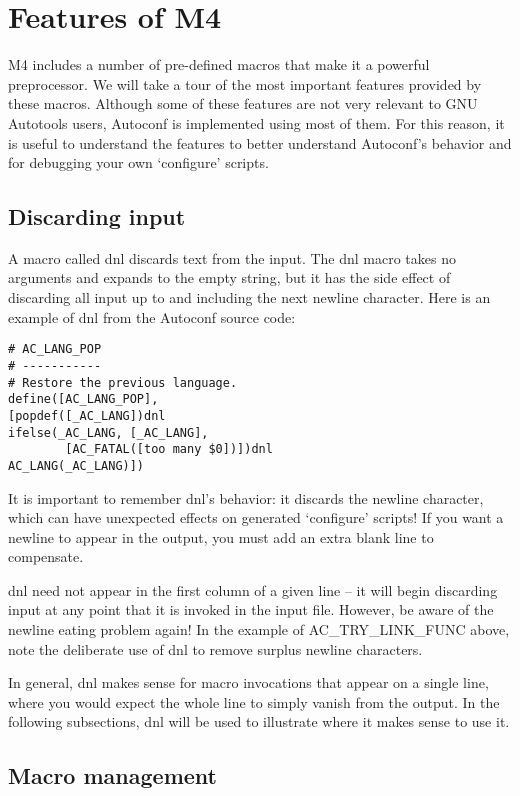 \section{Features of M4}

M4 includes a number of pre-defined macros that make it a powerful preprocessor. We will take a tour of the most important features provided by these macros. Although some of these features are not very relevant to GNU Autotools users, Autoconf is implemented using most of them. For this reason, it is useful to understand the features to better understand Autoconf's behavior and for debugging your own `configure' scripts. 

\subsection{Discarding input}

A macro called dnl discards text from the input. The dnl macro takes no arguments and expands to the empty string, but it has the side effect of discarding all input up to and including the next newline character. Here is an example of dnl from the Autoconf source code: 

\begin{Verbatim}[frame=single]
# AC_LANG_POP
# -----------
# Restore the previous language.
define([AC_LANG_POP],
[popdef([_AC_LANG])dnl
ifelse(_AC_LANG, [_AC_LANG],
        [AC_FATAL([too many $0])])dnl
AC_LANG(_AC_LANG)])
\end{Verbatim}

It is important to remember dnl's behavior: it discards the newline character,
which can have unexpected effects on generated `configure' scripts! If you 
want a newline to appear in the output, you must add an extra blank line to 
compensate.

dnl need not appear in the first column of a given line -- it will begin discarding input at any point that it is invoked in the input file. However, be aware of the newline eating problem again! In the example of AC\_{}TRY\_{}LINK\_{}FUNC above, note the deliberate use of dnl to remove surplus newline characters.

In general, dnl makes sense for macro invocations that appear on a single line, where you would expect the whole line to simply vanish from the output. In the following subsections, dnl will be used to illustrate where it makes sense to use it. 

\subsection{Macro management}

